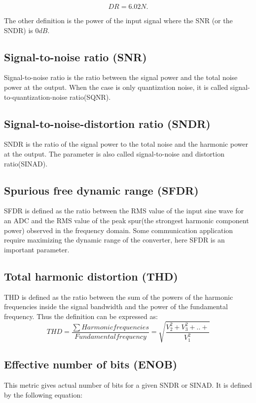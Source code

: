 \begin{equation}
    DR = 6.02N.
\end{equation}

The other definition is the power of the input signal where the SNR (or the SNDR) is $0dB$. 

\subsection{Signal-to-noise ratio (SNR)}
Signal-to-noise ratio is the ratio between the signal power and the total noise power at the output. When the case is only quantization noise, it is called signal-to-quantization-noise ratio(SQNR). 

\subsection{Signal-to-noise-distortion ratio (SNDR)}
SNDR is the ratio of the signal power to the total noise and the harmonic power at the output. The parameter is also called signal-to-noise and distortion ratio(SINAD).  

\subsection{Spurious free dynamic range (SFDR)}
SFDR is defined as the ratio between the RMS value of the input sine wave for an ADC and the RMS value of the peak spur(the strongest harmonic component power) observed in the frequency domain. Some communication application require maximizing the dynamic range of the converter, here SFDR is an important parameter. 

\subsection{Total harmonic distortion (THD)}
THD is defined  as the ratio between the sum of the powers of the harmonic frequencies inside the signal bandwidth and the power of the fundamental frequency. Thus the definition can be expressed as:
\begin{equation}
    THD = \frac{\sum Harmonic frequencies}{Fundamental frequency} = \sqrt{\frac{V_2^2 + V_3^2 + .. +}{V_1^2}}
\end{equation}

\subsection{Effective number of bits (ENOB)}
This metric gives actual number of bits for a given SNDR or SINAD. It is defined by the following equation:

